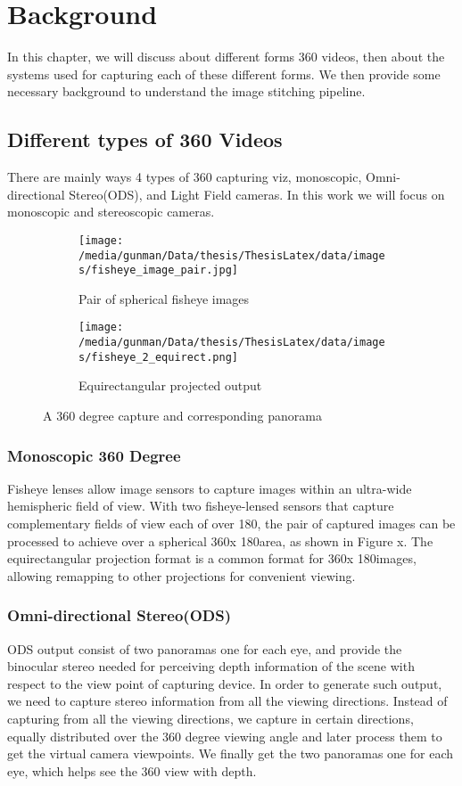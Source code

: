 \chapter{Background}
In this chapter, we will discuss about different forms 360 videos, then about the systems used for capturing each of these different forms. We then provide some necessary background to understand the image stitching pipeline.

\section{Different types of 360 Videos}
There are mainly ways 4 types of 360 capturing viz, monoscopic, Omni-directional Stereo(ODS), and Light Field cameras. In this work we will focus on monoscopic and stereoscopic cameras. 
\begin{figure}[h]
	\centering
	\begin{subfigure}{.5\textwidth}
		\centering
		\texttt{[image: /media/gunman/Data/thesis/ThesisLatex/data/images/fisheye\_image\_pair.jpg]}
		\caption{Pair of spherical fisheye images}
		\label{fig:sub1}
	\end{subfigure}%
	\begin{subfigure}{.5\textwidth}
		\centering
		\texttt{[image: /media/gunman/Data/thesis/ThesisLatex/data/images/fisheye\_2\_equirect.png]}
		\caption{Equirectangular projected output}
		\label{fig:sub2}
	\end{subfigure}
	\caption{A 360 degree capture and corresponding panorama}
	\label{fig:test}
\end{figure}
\subsection{Monoscopic 360 Degree}
Fisheye lenses allow image sensors to capture images within an ultra-wide hemispheric field of view. With two fisheye-lensed sensors that capture complementary fields of view each of over 180\textdegree, the pair of captured images can be processed to achieve over a spherical 360\textdegree x 180\textdegree area, as shown in Figure x. The equirectangular projection format is a common format for 360\textdegree x 180\textdegree images, allowing remapping to other projections for convenient viewing. 



\subsection{Omni-directional Stereo(ODS)}
ODS output consist of two panoramas one for each eye, and provide the binocular stereo needed for perceiving depth information of the scene with respect to the view point of capturing device. In order to generate such output, we need to capture stereo information from all the viewing directions. Instead of capturing from all the viewing directions, we capture in certain directions, equally distributed over the 360 degree viewing angle and later process them to get the virtual camera viewpoints. We finally get the two panoramas one for each eye, which helps see the 360 view with depth.


